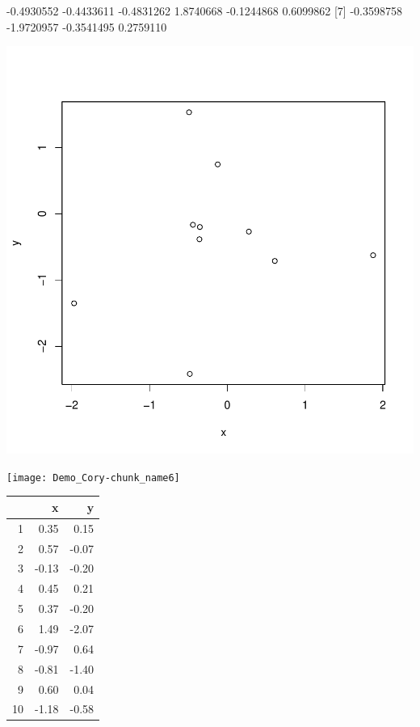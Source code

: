 \documentclass{article}
\begin{document}
\begin{Schunk}
\begin{Soutput}
 [1] -0.4930552 -0.4433611 -0.4831262  1.8740668 -0.1244868  0.6099862
 [7] -0.3598758 -1.9720957 -0.3541495  0.2759110
\end{Soutput}
\end{Schunk}
\includegraphics{Demo_Cory-chunk_name5}

\texttt{[image: Demo\_Cory-chunk\_name6]}

\begin{table}[ht]
\centering
\begin{tabular}{rrr}
  \hline
 & x & y \\ 
  \hline
1 & 0.35 & 0.15 \\ 
  2 & 0.57 & -0.07 \\ 
  3 & -0.13 & -0.20 \\ 
  4 & 0.45 & 0.21 \\ 
  5 & 0.37 & -0.20 \\ 
  6 & 1.49 & -2.07 \\ 
  7 & -0.97 & 0.64 \\ 
  8 & -0.81 & -1.40 \\ 
  9 & 0.60 & 0.04 \\ 
  10 & -1.18 & -0.58 \\ 
   \hline
\end{tabular}
\end{table}
\end{document}
